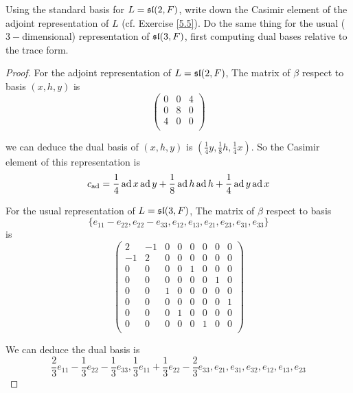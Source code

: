 \begin{ex}
  Using the standard basis for $L = \sl(2,F)$, write down the Casimir element of the adjoint representation of $L$ (cf. Exercise \ref{5.5}). Do the same thing for the usual ($3-$dimensional) representation of $\sl(3,F)$, first computing dual bases relative to the trace form.
\end{ex}
\begin{proof}
  For the adjoint representation of $L = \sl(2,F)$, The matrix of $\beta$ respect to basis $(x,h,y)$ is
  \begin{equation*}
    \begin{pmatrix}
      0 & 0 & 4 \\
      0 & 8 & 0 \\
      4 & 0 & 0 \\
    \end{pmatrix}
  \end{equation*}

  we can deduce the dual basis of $(x, h, y)$ is $(\frac{1}{4}y, \frac{1}{8}h, \frac{1}{4}x)$. So the Casimir element of this representation is
  \begin{equation*}
    c_{\ad} = \frac{1}{4}\ad x\ad y + \frac{1}{8}\ad h\ad h + \frac{1}{4}\ad y\ad x
  \end{equation*}

  For the usual representation of $L = \sl(3,F)$, The matrix of $\beta$ respect to basis
  \begin{equation*}
    \{e_{11} - e_{22}, e_{22} - e_{33}, e_{12}, e_{13}, e_{21}, e_{23}, e_{31}, e_{33}\}
  \end{equation*}
  is
  \begin{equation*}
    \begin{pmatrix}
      2 & -1 & 0 & 0 & 0 & 0 & 0 & 0 \\
      -1 & 2 & 0 & 0 & 0 & 0 & 0 & 0 \\
      0 & 0 & 0 & 0 & 1 & 0 & 0 & 0 \\
      0 & 0 & 0 & 0 & 0 & 0 & 1 & 0 \\
      0 & 0 & 1 & 0 & 0 & 0 & 0 & 0 \\
      0 & 0 & 0 & 0 & 0 & 0 & 0 & 1 \\
      0 & 0 & 0 & 1 & 0 & 0 & 0 & 0 \\
      0 & 0 & 0 & 0 & 0 & 1 & 0 & 0 \\
    \end{pmatrix}
  \end{equation*}

  We can deduce the dual basis is
  \begin{equation*}
    \frac{2}{3}e_{11} - \frac{1}{3}e_{22} - \frac{1}{3}e_{33}, \frac{1}{3}e_{11} + \frac{1}{3}e_{22} - \frac{2}{3}e_{33}, e_{21}, e_{31}, e_{32}, e_{12}, e_{13}, e_{23}
  \end{equation*}


\end{proof}
